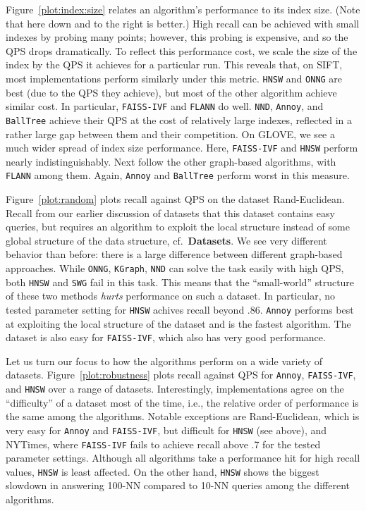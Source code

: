 Figure~\ref{plot:index:size} relates an algorithm's performance to its index
size. (Note that here down and to the right is better.) High recall can be achieved with small indexes by probing many points;
however, this probing is expensive, and so the QPS drops dramatically.
To reflect this performance cost, we scale the size of the index by the QPS it
achieves for a particular run.
This reveals that, on \textsf{SIFT}, most implementations perform similarly under 
this metric. \texttt{HNSW} and \texttt{ONNG} are best (due to the QPS they achieve), but most of the other 
algorithm achieve similar cost. In particular, \texttt{FAISS-IVF} and \texttt{FLANN} do well. \texttt{NND}, \texttt{Annoy}, and \texttt{BallTree} achieve their QPS at the cost of relatively large indexes, reflected in a rather large gap between them and their competition. On \textsf{GLOVE}, we see a much wider spread of index size performance. Here, \texttt{FAISS-IVF} and \texttt{HNSW} perform nearly indistinguishably. Next follow the other graph-based algorithms, with \texttt{FLANN} among
them. Again, \texttt{Annoy} and \texttt{BallTree} perform worst in this measure.

 Figure~\ref{plot:random} plots recall against QPS on the dataset \textsf{Rand-Euclidean}. Recall from our earlier discussion of datasets that this dataset contains easy queries, but requires an algorithm to exploit the local structure instead of some global structure of the data structure, cf.~\textbf{Datasets}. We see very different behavior than before: there is a large difference between different graph-based approaches. While \texttt{ONNG}, \texttt{KGraph},
\texttt{NND}
can solve the task easily with high QPS, both \texttt{HNSW} and \texttt{SWG} fail in this task. This means that the ``small-world'' structure of these two methods \emph{hurts} performance on such a dataset. In particular, no tested parameter setting for \texttt{HNSW} achives recall beyond .86. \texttt{Annoy} performs best at exploiting the local structure of the dataset and is the fastest algorithm. The dataset is also easy for \texttt{FAISS-IVF}, which also has very good performance.    

Let us turn our focus to how the algorithms perform on a wide variety of datasets. Figure~\ref{plot:robustness} plots recall against QPS for \texttt{Annoy}, \texttt{FAISS-IVF}, and \texttt{HNSW} over a range of datasets. Interestingly, implementations agree on the ``difficulty'' of a dataset most of the time, i.e., the relative order
of performance is the same among the algorithms. Notable exceptions are \textsf{Rand-Euclidean}, which is very easy for \texttt{Annoy} and \texttt{FAISS-IVF}, but difficult for \texttt{HNSW} (see above), and \textsf{NYTimes}, where \texttt{FAISS-IVF} fails to achieve recall above .7 for the tested parameter settings. Although all algorithms take a performance hit for high recall values, \texttt{HNSW} is least affected. On the other hand, \texttt{HNSW} shows the biggest slowdown in answering 100-NN
compared to 10-NN queries among the different algorithms.


